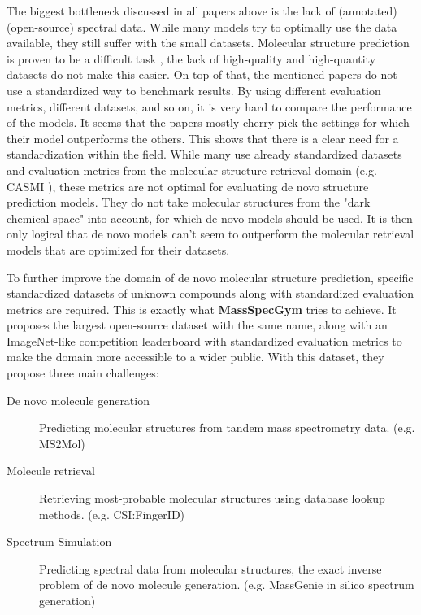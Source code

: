 The biggest bottleneck discussed in all papers above is the lack of (annotated) (open-source) spectral data. While many models try to optimally use the data available, they still suffer with the small datasets. Molecular structure prediction is proven to be a difficult task \cite{kretschmer2023small}, the lack of high-quality and high-quantity datasets do not make this easier.
On top of that, the mentioned papers do not use a standardized way to benchmark results. By using different evaluation metrics, different datasets, and so on, it is very hard to compare the performance of the models. It seems that the papers mostly cherry-pick the settings for which their model outperforms the others. This shows that there is a clear need for a standardization within the field.
While many use already standardized datasets and evaluation metrics from the molecular structure retrieval domain (e.g. CASMI \cite{schymanski2017critical}), these metrics are not optimal for evaluating de novo structure prediction models. They do not take molecular structures from the "dark chemical space" into account, for which de novo models should be used. It is then only logical that de novo models can't seem to outperform the molecular retrieval models that are optimized for their datasets.

To further improve the domain of de novo molecular structure prediction, specific standardized datasets of unknown compounds along with standardized evaluation metrics are required. This is exactly what \textbf{MassSpecGym} \cite{bushuiev2024massspecgym} tries to achieve. It proposes the largest open-source dataset with the same name, along with an ImageNet-like \cite{5206848} competition leaderboard with standardized evaluation metrics to make the domain more accessible to a wider public. With this dataset, they propose three main challenges:
\begin{description}
    \item[De novo molecule generation] Predicting molecular structures from tandem mass spectrometry data. (e.g. MS2Mol)
    \item[Molecule retrieval] Retrieving most-probable molecular structures using database lookup methods. (e.g. CSI:FingerID)
    \item[Spectrum Simulation] Predicting spectral data from molecular structures, the exact inverse problem of de novo molecule generation. (e.g. MassGenie in silico spectrum generation)
\end{description}

